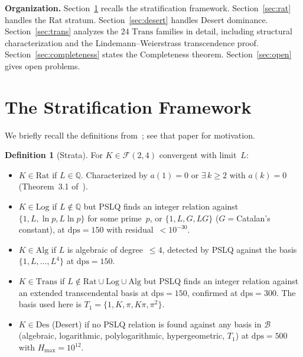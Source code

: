 \documentclass{amsart}
\theoremstyle{definition}
\newtheorem{definition}[theorem]{Definition}
\theoremstyle{remark}
\newcommand{\FF}{\mathcal{F}}
\newcommand{\Rat}{\mathrm{Rat}}
\newcommand{\Log}{\mathrm{Log}}
\newcommand{\Alg}{\mathrm{Alg}}
\newcommand{\Trans}{\mathrm{Trans}}
\newcommand{\Des}{\mathrm{Des}}
\newcommand{\dps}{\mathrm{dps}}
\begin{document}
\textbf{Organization.}
Section~\ref{sec:framework} recalls the stratification framework.
Section~\ref{sec:rat} handles the $\Rat$ stratum.
Section~\ref{sec:desert} handles Desert dominance.
Section~\ref{sec:trans} analyzes the $24$ $\Trans$ families in detail,
including structural characterization and the Lindemann--Weierstrass
transcendence proof.
Section~\ref{sec:completeness} states the Completeness theorem.
Section~\ref{sec:open} gives open problems.

\section{The Stratification Framework}\label{sec:framework}

We briefly recall the definitions from~\cite{synthesis}; see that paper
for motivation.

\begin{definition}[Strata]\label{def:strata}
For $K \in \FF(2,4)$ convergent with limit~$L$:
\begin{itemize}[leftmargin=1.5em]
\item $K \in \Rat$ if $L \in \mathbb{Q}$.
  Characterized by $a(1) = 0$ or
  $\exists\, k \ge 2$ with $a(k) = 0$
  (Theorem~3.1 of~\cite{contamination}).
\item $K \in \Log$ if $L \notin \mathbb{Q}$ but PSLQ
  finds an integer relation against
  $\{1, L, \ln p, L\ln p\}$ for some prime~$p$,
  or $\{1, L, G, LG\}$ ($G ={}$Catalan's constant),
  at $\dps = 150$ with residual~$< 10^{-30}$.
\item $K \in \Alg$ if $L$ is algebraic of
  degree~$\le 4$, detected by PSLQ against the
  basis $\{1, L, \dotsc, L^4\}$ at $\dps = 150$.
\item $K \in \Trans$ if
  $L \notin \Rat \cup \Log \cup \Alg$ but PSLQ
  finds an integer relation against an extended
  transcendental basis at $\dps = 150$,
  confirmed at $\dps = 300$.  The basis used here is
  $T_1 = \{1, K, \pi, K\pi, \pi^2\}$.
\item $K \in \Des$ (Desert) if no PSLQ relation
  is found against any basis in
  $\mathcal{B}$
  (algebraic, logarithmic, polylogarithmic,
  hypergeometric, $T_1$) at $\dps = 500$
  with $H_{\max} = 10^{12}$.
\end{itemize}
\end{definition}
\end{document}
